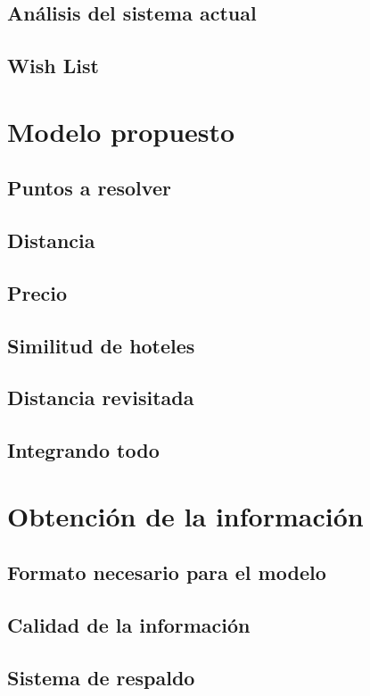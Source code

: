 \documentclass[12pt]{report}
\begin{document}
\section{Análisis del sistema actual}
\section{Wish List}

\chapter{Modelo propuesto}
\section{Puntos a resolver}
\section{Distancia}
\section{Precio}
\section{Similitud de hoteles}
\section{Distancia revisitada}
\section{Integrando todo}

\chapter{Obtención de la información}
\section{Formato necesario para el modelo}
\section{Calidad de la información}
\section{Sistema de respaldo}
\end{document}
